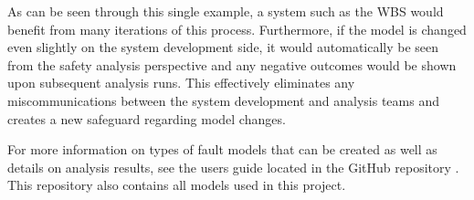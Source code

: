 As can be seen through this single example, a system such as the WBS would benefit from many iterations of this process. Furthermore, if the model is changed even slightly on the system development side, it would automatically be seen from the safety analysis perspective and any negative outcomes would be shown upon subsequent analysis runs. This effectively eliminates any miscommunications between the system development and analysis teams and creates a new safeguard regarding model changes. 

For more information on types of fault models that can be created as well as details on analysis results, see the users guide located in the GitHub repository \cite{SAGithub}. This repository also contains all models used in this project. 